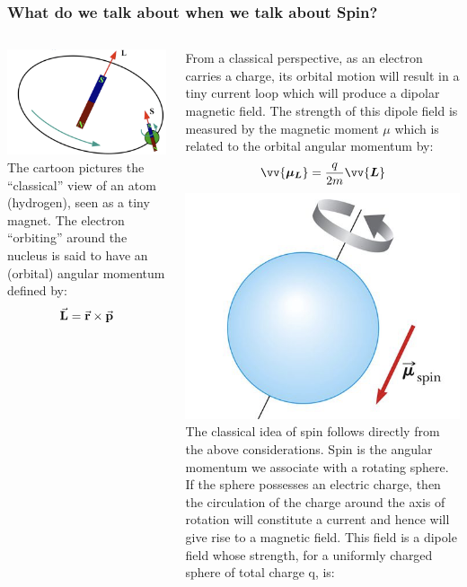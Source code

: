 
\begin{frame}
\frametitle{What do we talk about when we talk about Spin?}
\begin{columns}
 
\includegraphics[scale=0.1]{img/electronMagnet.png}
The cartoon pictures the ``classical'' view of an atom (hydrogen), seen as a tiny magnet. The electron ``orbiting'' around the nucleus is said to have an (orbital) angular momentum defined by:
\[
\va{L} = \va{r} \times \va{p}
\]

From a classical perspective, as an electron carries a charge, its orbital motion will result in a tiny current loop which will produce a dipolar magnetic field. The strength of this dipole field is measured by the magnetic moment $\mu$ which is related to the orbital angular momentum by:
\[
\vv{\bm{\mu_L}} = \frac{q}{2m}\vv{\bm{L}} 
\]
\includegraphics[scale=0.1]{img/classicalElectronSpin.png}
The classical idea of spin follows directly from the above considerations. Spin is the angular momentum we associate with a rotating sphere. If the sphere possesses an electric charge, then the circulation of the charge around the axis of rotation will constitute a current and hence will give rise to a magnetic field. This field is a dipole field whose strength, for a uniformly charged sphere of total charge q, is:


\end{columns}
\end{frame}
